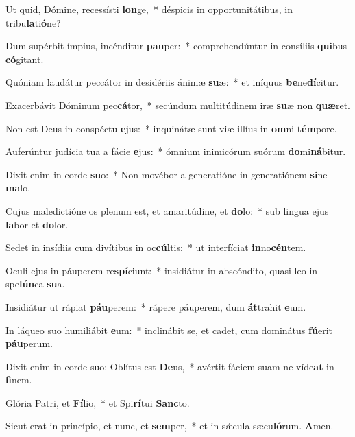 \item Ut quid, Dómine, recessísti \textbf{lon}ge,~* déspicis in opportunitátibus, in tribu\textbf{la}ti\textbf{ó}ne?
\item Dum supérbit ímpius, incénditur \textbf{pau}per:~* comprehendúntur in consíliis \textbf{qui}bus \textbf{có}gitant.
\item Quóniam laudátur peccátor in desidériis ánimæ \textbf{su}æ:~* et iníquus \textbf{be}ne\textbf{dí}citur.
\item Exacerbávit Dóminum pec\textbf{cá}tor,~* secúndum multitúdinem iræ \textbf{su}æ non \textbf{quæ}ret.
\item Non est Deus in conspéctu \textbf{e}jus:~* inquinátæ sunt viæ illíus in \textbf{om}ni \textbf{tém}pore.
\item Auferúntur judícia tua a fácie \textbf{e}jus:~* ómnium inimicórum suórum \textbf{do}mi\textbf{ná}bitur.
\item Dixit enim in corde \textbf{su}o:~* Non movébor a generatióne in generatiónem \textbf{si}ne \textbf{ma}lo.
\item Cujus maledictióne os plenum est, et amaritúdine, et \textbf{do}lo:~* sub lingua ejus \textbf{la}bor et \textbf{do}lor.
\item Sedet in insídiis cum divítibus in oc\textbf{cúl}tis:~* ut interfíciat \textbf{in}no\textbf{cén}tem.
\item Oculi ejus in páuperem re\textbf{spí}ciunt:~* insidiátur in abscóndito, quasi leo in spe\textbf{lún}ca \textbf{su}a.
\item Insidiátur ut rápiat \textbf{páu}perem:~* rápere páuperem, dum \textbf{át}trahit \textbf{e}um.
\item In láqueo suo humiliábit \textbf{e}um:~* inclinábit se, et cadet, cum dominátus \textbf{fú}erit \textbf{páu}perum.
\item Dixit enim in corde suo: Oblítus est \textbf{De}us,~* avértit fáciem suam ne víde\textbf{at} in \textbf{fi}nem.
\item Glória Patri, et \textbf{Fí}lio,~* et Spi\textbf{rí}tui \textbf{Sanc}to.
\item Sicut erat in princípio, et nunc, et \textbf{sem}per,~* et in sǽcula sæcu\textbf{ló}rum. \textbf{A}men.
